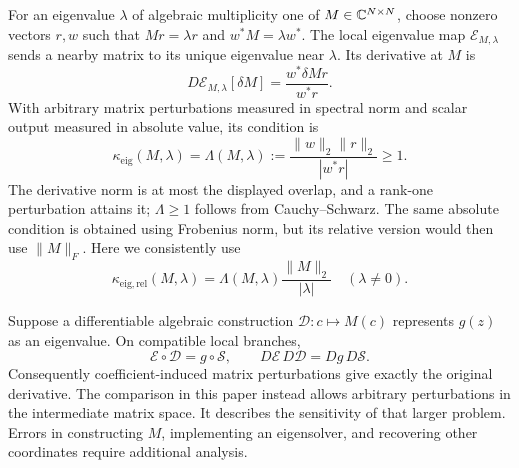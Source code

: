 For an eigenvalue $\lambda$ of algebraic multiplicity one of
$M\in\mathbb C^{N\times N}$, choose nonzero
vectors $r,w$ such that $Mr=\lambda r$ and $w^*M=\lambda w^*$.
The local eigenvalue map $\mathcal E_{M,\lambda}$ sends a nearby matrix to
its unique eigenvalue near $\lambda$. Its derivative at $M$ is
\[
 D\mathcal E_{M,\lambda}[\delta M]=\frac{w^*\delta M r}{w^*r}.
\]
With arbitrary matrix perturbations measured in spectral norm and scalar
output measured in absolute value, its condition is
\begin{equation}\label{eq:setup-overlap}
 \kappa_{\mathrm{eig}}(M,\lambda)
 =\Lambda(M,\lambda):=\frac{\|w\|_2\|r\|_2}{|w^*r|}\ge1.
\end{equation}
The derivative norm is at most the displayed overlap, and a rank-one
perturbation attains it; $\Lambda\ge1$ follows from Cauchy--Schwarz.
The same absolute condition is obtained using Frobenius norm,
but its relative version would then use $\|M\|_F$. Here we consistently use
\begin{equation}\label{eq:setup-eigen-relative}
 \kappa_{\mathrm{eig,rel}}(M,\lambda)
 =\Lambda(M,\lambda)\frac{\|M\|_2}{|\lambda|}
 \quad(\lambda\ne0).
\end{equation}

Suppose a differentiable algebraic construction $\mathcal D:c\mapsto M(c)$
represents $g(z)$ as an eigenvalue. On compatible local branches,
\begin{equation}\label{eq:setup-composition}
 \mathcal E\circ\mathcal D=g\circ\mathcal S,
 \qquad D\mathcal E\,D\mathcal D=Dg\,D\mathcal S.
\end{equation}
Consequently coefficient-induced matrix perturbations give exactly the
original derivative. The comparison in this paper instead allows arbitrary
perturbations in the intermediate matrix space. It describes the sensitivity
of that larger problem. Errors in constructing $M$, implementing an eigensolver,
and recovering other coordinates require additional analysis.

